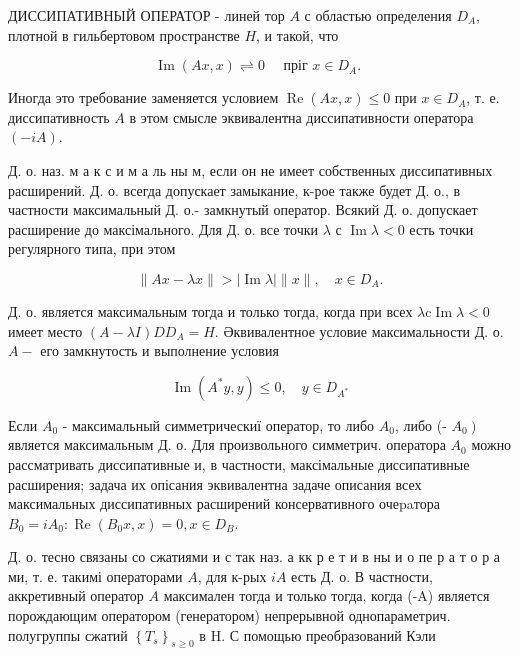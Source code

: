 \documentclass[10pt]{article}
\begin{document}
ДИССИПАТИВНЫЙ ОПЕРАТОР - линей тор $A$ с областью определения $D_{A}$, плотной в гильбертовом пространстве $H$, и такой, что



\[

\operatorname{Im}(A x, x) \rightleftharpoons 0 \quad \text { пріг } x \in D_{A} \text {. }

\]



Иногда это требование заменяется условием $\operatorname{Re}(A x, x) \leqslant 0$ при $x \in D_{A}$, т. е. диссипативность $A$ в этом смысле эквивалентна диссипативности оператора $(-i A)$.



Д. о. наз. м а к с и м а ль ны м, если он не имеет собственных диссипативных расширений. Д. о. всегда допускает замыкание, к-рое также будет Д. о., в частности максимальный Д. о.- замкнутый оператор. Всякий Д. о. допускает расширение до максімального. Для Д. о. все точки $\lambda$ с $\operatorname{Im} \lambda<0$ есть точки регулярного типа, при этом



\[

\|A x-\lambda x\|>|\operatorname{Im} \lambda|\|x\|, \quad x \in D_{A} .

\]



Д. о. является максимальным тогда и только тогда, когда при всех $\lambda \mathrm{c} \operatorname{Im} \lambda<0$ имеет место $(A-\lambda I) D D_{A}=H$. Әквивалентное условие максимальности Д. о. $A-$ его замкнутость и выполнение условия



\[

\operatorname{Im}\left(A^{*} y, y\right) \leqslant 0, \quad y \in D_{A^{*}}

\]



Если $A_{0}$ - максимальный симметрическиї оператор, то либо $A_{0}$, либо (- $\left.A_{0}\right)$ является максимальным Д. о. Для произвольного симметрич. оператора $A_{0}$ можно рассматривать диссипативные и, в частности, максімальные диссипативные расширения; задача их опісания эквивалентна задаче описания всех максимальных диссипативных расширений консервативного очеpaтора $B_{0}=i A_{0}: \operatorname{Re}\left(B_{0} x, x\right)=0, x \in D_{B}$.



Д. о. тесно связаны со сжатиями и с так наз. а кк р е т и в ны и о пе р а т о р а ми, т. е. такимі операторами $A$, для к-рых $i A$ есть Д. о. В частности, аккретивный оператор $A$ максимален тогда и только тогда, когда (-A) является порождающим оператором (генератором) непрерывной однопараметрич. полугруппы сжатий $\left\{T_{s}\right\}_{s \geqslant 0}$ в H. С помощью преобразований Кэли
\end{document}
